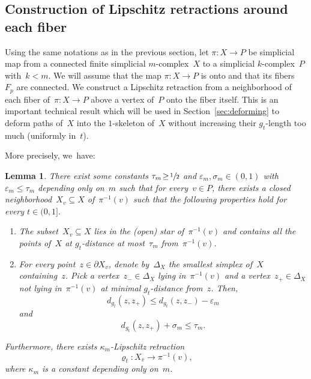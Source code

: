\documentclass[11pt]{article}
\let\oldsfrac\sfrac
\renewcommand{\sfrac}[2]{{\oldsfrac{#1}{#2}}}
\newtheorem{lemma}[theorem]{Lemma}
\theoremstyle{definition}
\numberwithin{equation}{section}
\begin{document}
\subsection{Construction of Lipschitz retractions around each fiber}

Using the same notations as in the previous section, let $\pi:X \to P$ be simplicial map from a connected finite simplicial $m$\nobreakdash-complex~$X$ to a simplicial $k$-complex~$P$ with~$k<m$.
We will assume that the map $\pi:X \to P$ is onto and that its fibers~$F_p$ are connected.
We construct a Lipschitz retraction from a neighborhood of each fiber of~$\pi:X \to P$ above a vertex of~$P$ onto the fiber itself.
This is an important technical result which will be used in Section~\ref{sec:deforming} to deform paths of~$X$ into the $1$-skeleton of~$X$ without increasing their $g_t$-length too much (uniformly in~$t$).

More precisely, we~have:

\begin{lemma} \label{lem:Xv}
There exist some constants $\tau_m \!\geq\! \sfrac{1}{2}$ and $\varepsilon_m, \sigma_m \!\in\! (0,1)$ with $\varepsilon_m \!\leq\! \tau_m$ depending only on~$m$ such that for every~$v \in P$, there exists a closed neighborhood~$X_v \subseteq X$ of~$\pi^{-1}(v)$ such that the following properties hold for every $t \in (0,1]$.
\begin{enumerate}
\item\label{lem:Xv1} The subset~$X_v \subseteq X$ lies in the (open) star of~$\pi^{-1}(v)$ and contains all the points of~$X$ at $g_t$-distance at most~$\tau_m$ from~$\pi^{-1}(v)$.
\item\label{lem:Xv2} For every point~$z \in \partial X_v$, denote by~$\Delta_X$ the smallest simplex of~$X$ containing~$z$.
Pick a vertex~$z_- \in \Delta_X$ lying in~$\pi^{-1}(v)$ and a vertex~$z_+ \in \Delta_X$ not lying in~$\pi^{-1}(v)$ at minimal $g_t$-distance from~$z$.
Then,
\begin{equation} \label{eq:z}
d_{g_t}(z,z_+) \leq d_{g_t}(z,z_-) - \varepsilon_m
\end{equation}
and
\begin{equation} \label{eq:zz}
d_{g_t}(z,z_+) + \sigma_m \leq \tau_m.
\end{equation}
\end{enumerate}

Furthermore, there exists $\kappa_m$-Lipschitz retraction
\[
\varrho_t:X_v \to \pi^{-1}(v),
\]
where $\kappa_m$ is a constant depending only on~$m$.
\end{lemma}
\end{document}
